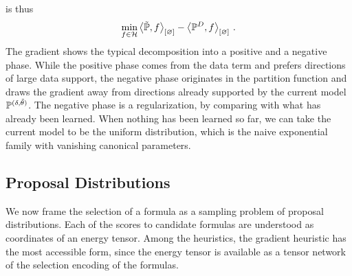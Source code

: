  is thus
\begin{align}
    \min_{f\in\mathcal{H}} \left\langle \tilde{\mathbb{P}},f\right\rangle_{\left[ \varnothing \right]} - \left\langle \mathbb{P}^{D},f\right\rangle_{\left[ \varnothing \right]}   \, .
\end{align}
The gradient shows the typical decomposition into a positive and a negative phase.
While the positive phase comes from the data term and prefers directions of large data support, the negative phase originates in the partition function and draws the gradient away from directions already supported by the current model $\mathbb{P}^{(\delta, \tilde{\theta})}$.
The negative phase is a regularization, by comparing with what has already been learned.
When nothing has been learned so far, we can take the current model to be the uniform distribution, which is the naive exponential family with vanishing canonical parameters.






\subsection{Proposal Distributions}

We now frame the selection of a formula as a sampling problem of proposal distributions.
Each of the scores to candidate formulas are understood as coordinates of an energy tensor.
Among the heuristics, the gradient heuristic has the most accessible form, since the energy tensor is available as a tensor network of the selection encoding of the formulas.



